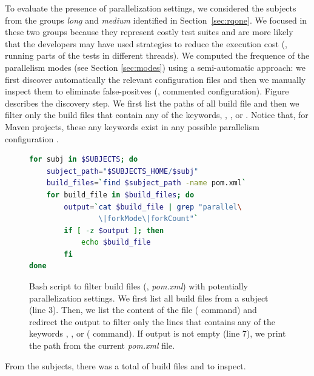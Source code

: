 To evaluate the presence of parallelization settings, we considered
the \numSubjsRqTwo{} subjects from the groups \emph{long} and
\emph{medium} identified in Section~\ref{sec:rqone}. We focused in
these two groups because they represent costly test suites and are
more likely that the developers may have used strategies to reduce the
execution cost (\eg, running parts of the tests in different threads).
We computed the frequence of the parallelism modes (see Section
\ref{sec:modes}) using a semi-automatic approach: we first discover
automatically the relevant configuration files and then we manually
inspect them to eliminate false-positves (\eg, commented
configuration).  Figure  describes the discovery step. We first
list the paths of all build file and then we filter only the build
files that contain any of the keywords, ,
, or . Notice that, for Maven
projects, these any keywords exist in any possible parallelism
configuration .

\begin{figure}[h!]
\centering
\scriptsize
{}
\begin{lstlisting}[language=Bash]
for subj in $SUBJECTS; do
    subject_path="$SUBJECTS_HOME/$subj"
    build_files=`find $subject_path -name pom.xml`
    for build_file in $build_files; do
        output=`cat $build_file | grep "parallel\
                \|forkMode\|forkCount"`
        if [ -z $output ]; then
            echo $build_file
        fi
done
\end{lstlisting}
    \caption{\label{fig:discovery-step} Bash script to filter
    build files (\ie, \emph{pom.xml}) with potentially parallelization
    settings. We first list all build files from a subject (line 3).
    Then, we list the content of the file (\CodeIn{cat} command) and
    redirect the output to filter only the lines that contains any of
    the keywords \CodeIn{parallel}, \CodeIn{forkMode}, or
     ( command). If output is not empty
    (line 7), we print the path from the current \emph{pom.xml} file.}
\end{figure}

From the \numSubjsRqTwo{} subjects, there was a total of  build
files and \Fix{Y} to inspect.

\Fix{---------------------}


